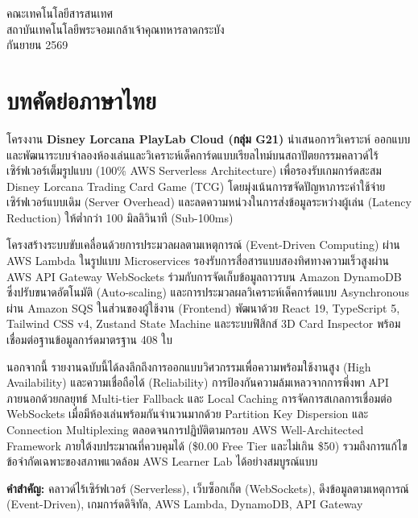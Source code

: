 \documentclass[12pt,a4paper]{report}
\begin{document}
\begin{titlepage}
\begin{center}
    \vfill
    {\fontsize{15pt}{18pt}\selectfont
    คณะเทคโนโลยีสารสนเทศ\\
    สถาบันเทคโนโลยีพระจอมเกล้าเจ้าคุณทหารลาดกระบัง\\
    กันยายน 2569}
\end{center}
\end{titlepage}

\setcounter{page}{1}

\chapter*{บทคัดย่อภาษาไทย}

โครงงาน \textbf{Disney Lorcana PlayLab Cloud (กลุ่ม G21)} นำเสนอการวิเคราะห์ ออกแบบ และพัฒนาระบบจำลองห้องเล่นและวิเคราะห์เด็คการ์ดแบบเรียลไทม์บนสถาปัตยกรรมคลาวด์ไร้เซิร์ฟเวอร์เต็มรูปแบบ (100\% AWS Serverless Architecture) เพื่อรองรับเกมการ์ดสะสม Disney Lorcana Trading Card Game (TCG) โดยมุ่งเน้นการขจัดปัญหาภาระค่าใช้จ่ายเซิร์ฟเวอร์แบบเดิม (Server Overhead) และลดความหน่วงในการส่งข้อมูลระหว่างผู้เล่น (Latency Reduction) ให้ต่ำกว่า 100 มิลลิวินาที (Sub-100ms)

โครงสร้างระบบขับเคลื่อนด้วยการประมวลผลตามเหตุการณ์ (Event-Driven Computing) ผ่าน AWS Lambda ในรูปแบบ Microservices รองรับการสื่อสารแบบสองทิศทางความเร็วสูงผ่าน AWS API Gateway WebSockets ร่วมกับการจัดเก็บข้อมูลถาวรบน Amazon DynamoDB ซึ่งปรับขนาดอัตโนมัติ (Auto-scaling) และการประมวลผลวิเคราะห์เด็คการ์ดแบบ Asynchronous ผ่าน Amazon SQS ในส่วนของผู้ใช้งาน (Frontend) พัฒนาด้วย React 19, TypeScript 5, Tailwind CSS v4, Zustand State Machine และระบบฟิสิกส์ 3D Card Inspector พร้อมเชื่อมต่อฐานข้อมูลการ์ดมาตรฐาน 408 ใบ

นอกจากนี้ รายงานฉบับนี้ได้ลงลึกถึงการออกแบบวิศวกรรมเพื่อความพร้อมใช้งานสูง (High Availability) และความเชื่อถือได้ (Reliability) การป้องกันความล้มเหลวจากการพึ่งพา API ภายนอกด้วยกลยุทธ์ Multi-tier Fallback และ Local Caching การจัดการสเกลการเชื่อมต่อ WebSockets เมื่อมีห้องเล่นพร้อมกันจำนวนมากด้วย Partition Key Dispersion และ Connection Multiplexing ตลอดจนการปฏิบัติตามกรอบ AWS Well-Architected Framework ภายใต้งบประมาณที่ควบคุมได้ (\$0.00 Free Tier และไม่เกิน \$50) รวมถึงการแก้ไขข้อจำกัดเฉพาะของสภาพแวดล้อม AWS Learner Lab ได้อย่างสมบูรณ์แบบ

\vspace{0.8cm}
\noindent \textbf{คำสำคัญ:} คลาวด์ไร้เซิร์ฟเวอร์ (Serverless), เว็บซ็อกเก็ต (WebSockets), ดึงข้อมูลตามเหตุการณ์ (Event-Driven), เกมการ์ดดิจิทัล, AWS Lambda, DynamoDB, API Gateway
\end{document}
